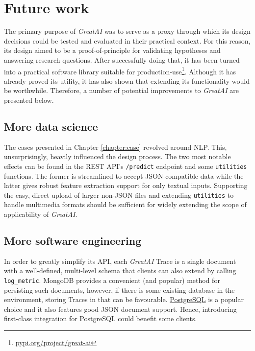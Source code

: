 \section{Future work} 

The primary purpose of \textit{GreatAI} was to serve as a proxy through which its design decisions could be tested and evaluated in their practical context. For this reason, its design aimed to be a proof-of-principle for validating hypotheses and answering research questions. After successfully doing that, it has been turned into a practical software library suitable for production-use\footnote{\href{https://pypi.org/project/great-ai/}{pypi.org/project/great-ai}}. Although it has already proved its utility, it has also shown that extending its functionality would be worthwhile. Therefore, a number of potential improvements to \textit{GreatAI} are presented below.
 
\subsection{More data science}

The cases presented in Chapter \ref{chapter:case} revolved around NLP. This, unsurprisingly, heavily influenced the design process. The two most notable effects can be found in the REST API's \texttt{/predict} endpoint and some \texttt{utilities} functions. The former is streamlined to accept JSON compatible data while the latter gives robust feature extraction support for only textual inputs. Supporting the easy, direct upload of larger non-JSON files and extending \texttt{utilities} to handle multimedia formats should be sufficient for widely extending the scope of applicability of \textit{GreatAI}.

\subsection{More software engineering}

In order to greatly simplify its API, each \textit{GreatAI} Trace is a single document with a well-defined, multi-level schema that clients can also extend by calling \texttt{log\_metric}. MongoDB provides a convenient (and popular) method for persisting such documents, however, if there is some existing database in the environment, storing Traces in that can be favourable. \href{https://www.postgresql.org/}{PostgreSQL} is a popular choice and it also features good JSON document support. Hence, introducing first-class integration for PostgreSQL could benefit some clients.

